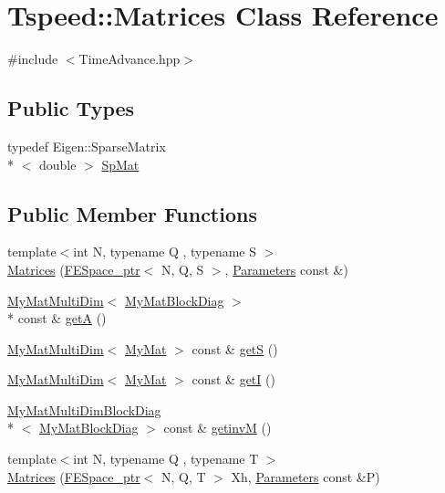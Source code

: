 \hypertarget{classTspeed_1_1Matrices}{\section{Tspeed\-:\-:Matrices Class Reference}
\label{classTspeed_1_1Matrices}
}


{\ttfamily \#include $<$Time\-Advance.\-hpp$>$}

\subsection*{Public Types}
\begin{DoxyCompactItemize}
\item 
typedef Eigen\-::\-Sparse\-Matrix\\*
$<$ double $>$ \hyperlink{classTspeed_1_1Matrices_aec4249f1ac32c3249adae9c91bac1cbf}{Sp\-Mat}
\end{DoxyCompactItemize}
\subsection*{Public Member Functions}
\begin{DoxyCompactItemize}
\item 
{\footnotesize template$<$int N, typename Q , typename S $>$ }\\\hyperlink{classTspeed_1_1Matrices_ad4b46e2f7a2056a6c5f3a803157236bc}{Matrices} (\hyperlink{namespaceTspeed_a05fcb57094666c8f5ab1e90d1a6fecf8}{F\-E\-Space\-\_\-ptr}$<$ N, Q, S $>$, \hyperlink{classTspeed_1_1Parameters}{Parameters} const \&)
\item 
\hyperlink{classTspeed_1_1MyMatMultiDim}{My\-Mat\-Multi\-Dim}$<$ \hyperlink{classTspeed_1_1MyMatBlockDiag}{My\-Mat\-Block\-Diag} $>$\\*
 const \& \hyperlink{classTspeed_1_1Matrices_a4ee3310af2c6fa476099673ebf61c242}{get\-A} ()
\item 
\hyperlink{classTspeed_1_1MyMatMultiDim}{My\-Mat\-Multi\-Dim}$<$ \hyperlink{classTspeed_1_1MyMat}{My\-Mat} $>$ const \& \hyperlink{classTspeed_1_1Matrices_a95dfd802f178cf5dc51967ad70cf36cd}{get\-S} ()
\item 
\hyperlink{classTspeed_1_1MyMatMultiDim}{My\-Mat\-Multi\-Dim}$<$ \hyperlink{classTspeed_1_1MyMat}{My\-Mat} $>$ const \& \hyperlink{classTspeed_1_1Matrices_a78c435049af0aa48eacd9a9dc99627fa}{get\-I} ()
\item 
\hyperlink{classTspeed_1_1MyMatMultiDimBlockDiag}{My\-Mat\-Multi\-Dim\-Block\-Diag}\\*
$<$ \hyperlink{classTspeed_1_1MyMatBlockDiag}{My\-Mat\-Block\-Diag} $>$ const \& \hyperlink{classTspeed_1_1Matrices_a5358482d27d03d838c597ec2eb79a71c}{getinv\-M} ()
\item 
{\footnotesize template$<$int N, typename Q , typename T $>$ }\\\hyperlink{classTspeed_1_1Matrices_a1893bd97b0320d078e6cd1e97e3cbd5a}{Matrices} (\hyperlink{namespaceTspeed_a05fcb57094666c8f5ab1e90d1a6fecf8}{F\-E\-Space\-\_\-ptr}$<$ N, Q, T $>$ Xh, \hyperlink{classTspeed_1_1Parameters}{Parameters} const \&P)
\end{DoxyCompactItemize}


